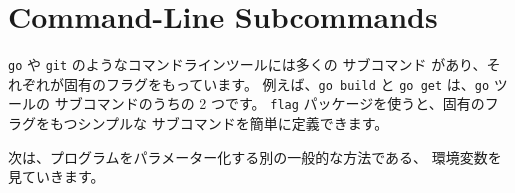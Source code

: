 \section{Command-Line Subcommands}

\texttt{go} や \texttt{git} のようなコマンドラインツールには多くの サブコマンド があり、それぞれが固有のフラグをもっています。 例えば、\texttt{go build} と \texttt{go get} は、\texttt{go} ツールの サブコマンドのうちの 2 つです。 \texttt{flag} パッケージを使うと、固有のフラグをもつシンプルな サブコマンドを簡単に定義できます。




次は、プログラムをパラメーター化する別の一般的な方法である、 環境変数を見ていきます。